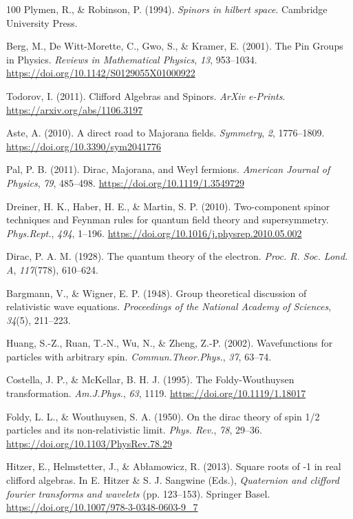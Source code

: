 \documentclass[11pt]{book}
\begin{document}
\begin{thebibliography}{100}
 Plymen, R., \& Robinson, P. (1994). \emph{Spinors in hilbert space}.
Cambridge University Press.

 Berg, M., De Witt-Morette, C., Gwo, S., \& Kramer, E. (2001). The Pin
Groups in Physics. \emph{Reviews in Mathematical Physics}, \emph{13},
953--1034. \url{https://doi.org/10.1142/S0129055X01000922}

 Todorov, I. (2011). Clifford Algebras and Spinors. \emph{ArXiv
e-Prints}. \url{https://arxiv.org/abs/1106.3197}

 Aste, A. (2010). A direct road to Majorana fields. \emph{Symmetry},
\emph{2}, 1776--1809. \url{https://doi.org/10.3390/sym2041776}

 Pal, P. B. (2011). Dirac, Majorana, and Weyl fermions. \emph{American
Journal of Physics}, \emph{79}, 485--498.
\url{https://doi.org/10.1119/1.3549729}

 Dreiner, H. K., Haber, H. E., \& Martin, S. P. (2010). Two-component
spinor techniques and Feynman rules for quantum field theory and
supersymmetry. \emph{Phys.Rept.}, \emph{494}, 1--196.
\url{https://doi.org/10.1016/j.physrep.2010.05.002}

 Dirac, P. A. M. (1928). The quantum theory of the electron. \emph{Proc.
R. Soc. Lond. A}, \emph{117}(778), 610--624.

 Bargmann, V., \& Wigner, E. P. (1948). Group theoretical discussion of
relativistic wave equations. \emph{Proceedings of the National Academy
of Sciences}, \emph{34}(5), 211--223.

 Huang, S.-Z., Ruan, T.-N., Wu, N., \& Zheng, Z.-P. (2002). Wavefunctions
for particles with arbitrary spin. \emph{Commun.Theor.Phys.}, \emph{37},
63--74.

 Costella, J. P., \& McKellar, B. H. J. (1995). The Foldy-Wouthuysen
transformation. \emph{Am.J.Phys.}, \emph{63}, 1119.
\url{https://doi.org/10.1119/1.18017}

 Foldy, L. L., \& Wouthuysen, S. A. (1950). On the dirac theory of spin
1/2 particles and its non-relativistic limit. \emph{Phys. Rev.},
\emph{78}, 29--36. \url{https://doi.org/10.1103/PhysRev.78.29}

 Hitzer, E., Helmstetter, J., \& Abłamowicz, R. (2013). Square roots of
-1 in real clifford algebras. In E. Hitzer \& S. J. Sangwine (Eds.),
\emph{Quaternion and clifford fourier transforms and wavelets} (pp.
123--153). Springer Basel.
\url{https://doi.org/10.1007/978-3-0348-0603-9_7}


\end{thebibliography}
\end{document}
